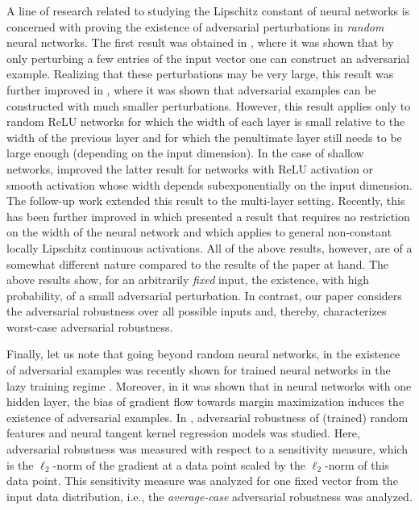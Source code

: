 A line of research related to studying the Lipschitz constant of neural networks is concerned with proving the existence
of adversarial perturbations in \emph{random} neural networks.
The first result was obtained in \cite{shamir2019simple}, where it was shown that
by only perturbing a few entries of the input vector one can construct an adversarial example.
Realizing that these perturbations may be very large,
this result was further improved in \cite{daniely2020most},
where it was shown that adversarial examples can be constructed with much smaller perturbations.
However, this result applies only to random ReLU networks for which the width of each layer
is small relative to the width of the previous layer and for which the penultimate layer still needs to be large enough (depending on the input dimension).
In the case of shallow networks, \cite{bubeck2021single} improved the latter result for networks
with ReLU activation or smooth activation whose width depends subexponentially on the input dimension.
The follow-up work \cite{bartlett2021adversarial} extended this result to the multi-layer setting.
Recently, this has been further improved in \cite{montanari2023adversarial}
which presented a result that requires no restriction on the width of the neural network
and which applies to general non-constant locally Lipschitz continuous activations.
All of the above results, however, are of a somewhat different nature compared to the results of the paper at hand.
The above results show, for an arbitrarily \emph{fixed} input, the existence,
with high probability, of a small adversarial perturbation. 
In contrast, our paper considers the adversarial robustness over all possible inputs and,
thereby, characterizes worst-case adversarial robustness.

Finally, let us note that going beyond random neural networks,
in \cite{wang2022adversarial} the existence of adversarial examples was recently shown
for trained neural networks in the lazy training regime \cite{chizat2019lazy}.
Moreover, in \cite{vardi2022gradient,frei2023double} it was shown that in neural networks
with one hidden layer, the bias of gradient flow towards margin maximization induces
the existence of adversarial examples.
In \cite{bombari2023beyond}, adversarial robustness of (trained) random features
and neural tangent kernel regression models was studied.
Here, adversarial robustness was measured with respect to a sensitivity measure,
which is the $\ell_2$-norm of the gradient at a data point scaled by the $\ell_2$-norm of this data point.
 This sensitivity measure was analyzed for one fixed vector from the input data distribution,
 i.e., the \emph{average-case} adversarial robustness was analyzed.








